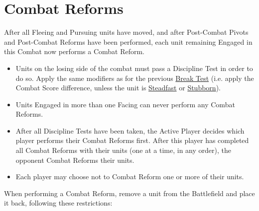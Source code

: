 \newpage
\section{Combat Reforms}
\label{combat_reform}

After all Fleeing and Pursuing units have moved, and after Post-Combat Pivots and Post-Combat Reforms have been performed, each unit remaining Engaged in this Combat now performs a Combat Reform.

\begin{itemize}
	\item Units on the losing side of the combat must pass a Discipline Test in order to do so. Apply the same modifiers as for the previous \hyperref[break_test]{Break Test} (i.e. apply the Combat Score difference, unless the unit is \hyperref[steadfast]{Steadfast} or \hyperref[stubborn]{Stubborn}).
	\item Units Engaged in more than one Facing can never perform any Combat Reforms.
	\item After all Discipline Tests have been taken, the Active Player decides which player performs their Combat Reforms first. After this player has completed all Combat Reforms with their units (one at a time, in any order), the opponent Combat Reforms their units.
	\item Each player may choose not to Combat Reform one or more of their units.
\end{itemize}

\columnbreak

When performing a Combat Reform, remove a unit from the Battlefield and place it back, following these restrictions:


